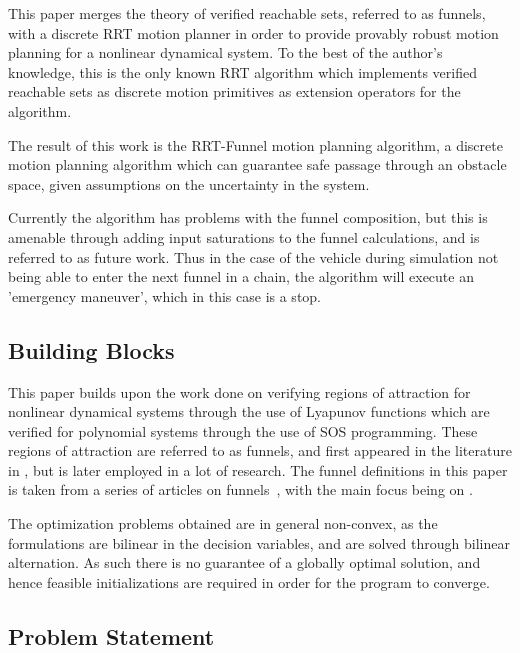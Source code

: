 This paper merges the theory of verified reachable sets, referred to as funnels,
with a discrete \ac{RRT} motion planner in order to provide provably robust
motion planning for a nonlinear dynamical system. To the best of the author's
knowledge, this is the only known \ac{RRT} algorithm which implements verified
reachable sets as discrete motion primitives as extension operators for the
algorithm.

The result of this work is the RRT-Funnel motion planning algorithm, a discrete
motion planning algorithm which can guarantee safe passage through an obstacle
space, given assumptions on the uncertainty in the system.

Currently the algorithm has problems with the funnel composition, but this is
amenable through adding input saturations to the funnel calculations, and is
referred to as future work. Thus in the case of the vehicle during simulation
not being able to enter the next funnel in a chain, the algorithm will execute
an 'emergency maneuver', which in this case is a stop.

\subsection{Building Blocks}

This paper builds upon the work done on verifying regions of attraction for
nonlinear dynamical systems through the use of Lyapunov functions which are
verified for polynomial systems through the use of \ac{SOS} programming. These
regions of attraction are referred to as funnels, and first appeared in the
literature in \cite{masonMechanicsManipulation1985}, but is later employed in a
lot of research. The funnel definitions in this paper is taken from a series of
articles on funnels~\cite{Tobenkin_2011,tedrakeLQRtreesFeedbackMotion2009,
  majumdarRobustOnlineMotion2013,
  majumdarFunnelLibrariesRealtime2017,ahmadi2014dsos}, with the main focus being
on \cite{majumdarFunnelLibrariesRealtime2017}.

The optimization problems obtained are in general non-convex, as the
formulations are bilinear in the decision variables, and are solved through
bilinear alternation. As such there is no guarantee of a globally optimal
solution, and hence feasible initializations are required in order for the
program to converge.

\subsection{Problem Statement}

